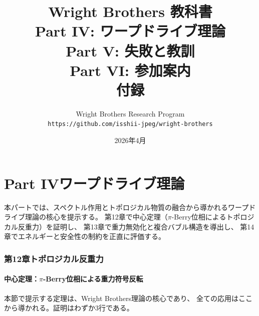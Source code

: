 \documentclass[11pt,a4paper]{article}
\begin{document}
\title{\Huge\bfseries Wright Brothers 教科書\\[0.5em]
\Large Part IV: ワープドライブ理論\\
Part V: 失敗と教訓\\
Part VI: 参加案内\\
付録}
\author{Wright Brothers Research Program\\
\texttt{https://github.com/isshii-jpeg/wright-brothers}}
\date{2026年4月}

\maketitle

\tableofcontents
\newpage


\part*{Part IV\quad ワープドライブ理論}

\vspace{1em}
\noindent
本パートでは、スペクトル作用とトポロジカル物質の融合から導かれるワープドライブ理論の核心を提示する。
第12章で中心定理（$\pi$-Berry位相によるトポロジカル反重力）を証明し、
第13章で重力無効化と複合バブル構造を導出し、
第14章でエネルギーと安全性の制約を正直に評価する。



\section{第12章\quad トポロジカル反重力}
\label{ch:topological-antigravity}

\subsection{中心定理：$\pi$-Berry位相による重力符号反転}
\label{sec:12.1}

本節で提示する定理は、Wright Brothers理論の核心であり、
全ての応用はここから導かれる。証明はわずか3行である。
\end{document}
